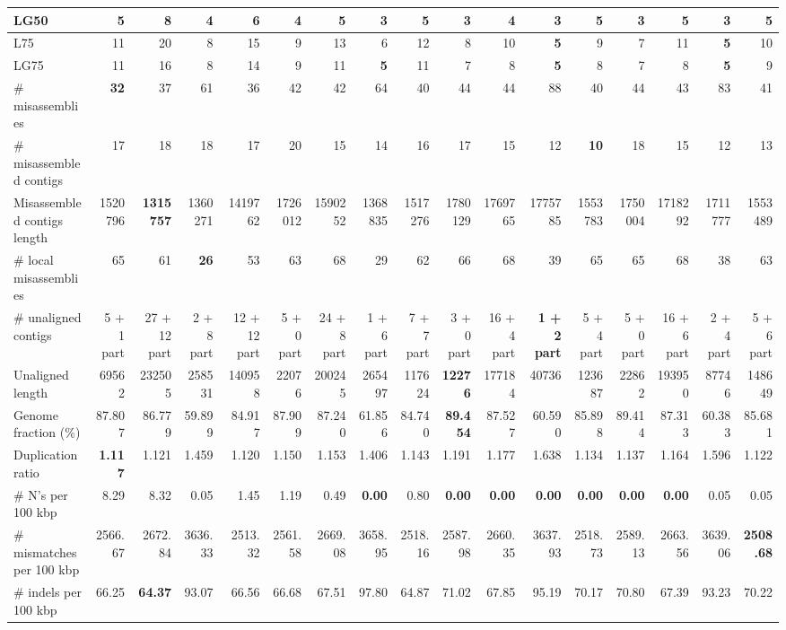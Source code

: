 \documentclass[12pt,a4paper]{article}
\begin{document}
\begin{table}[ht]
\begin{center}
\begin{tabular}{|l*{16}{|r}|}
LG50 & 5 & 8 & 4 & 6 & 4 & 5 & {\bf 3} & 5 & {\bf 3} & 4 & {\bf 3} & 5 & {\bf 3} & 5 & {\bf 3} & 5 \\ \hline
L75 & 11 & 20 & 8 & 15 & 9 & 13 & 6 & 12 & 8 & 10 & {\bf 5} & 9 & 7 & 11 & {\bf 5} & 10 \\ \hline
LG75 & 11 & 16 & 8 & 14 & 9 & 11 & {\bf 5} & 11 & 7 & 8 & {\bf 5} & 8 & 7 & 8 & {\bf 5} & 9 \\ \hline
\# misassemblies & {\bf 32} & 37 & 61 & 36 & 42 & 42 & 64 & 40 & 44 & 44 & 88 & 40 & 44 & 43 & 83 & 41 \\ \hline
\# misassembled contigs & 17 & 18 & 18 & 17 & 20 & 15 & 14 & 16 & 17 & 15 & 12 & {\bf 10} & 18 & 15 & 12 & 13 \\ \hline
Misassembled contigs length & 1520796 & {\bf 1315757} & 1360271 & 1419762 & 1726012 & 1590252 & 1368835 & 1517276 & 1780129 & 1769765 & 1775785 & 1553783 & 1750004 & 1718292 & 1711777 & 1553489 \\ \hline
\# local misassemblies & 65 & 61 & {\bf 26} & 53 & 63 & 68 & 29 & 62 & 66 & 68 & 39 & 65 & 65 & 68 & 38 & 63 \\ \hline
\# unaligned contigs & 5 + 1 part & 27 + 12 part & 2 + 8 part & 12 + 12 part & 5 + 0 part & 24 + 8 part & 1 + 6 part & 7 + 7 part & 3 + 0 part & 16 + 4 part & {\bf 1 + 2 part} & 5 + 4 part & 5 + 0 part & 16 + 6 part & 2 + 4 part & 5 + 6 part \\ \hline
Unaligned length & 69562 & 232505 & 258531 & 140958 & 22076 & 200245 & 265497 & 117624 & {\bf 12276} & 177184 & 40736 & 123687 & 22862 & 193950 & 87746 & 148649 \\ \hline
Genome fraction (\%) & 87.807 & 86.779 & 59.899 & 84.917 & 87.909 & 87.240 & 61.856 & 84.740 & {\bf 89.454} & 87.527 & 60.590 & 85.898 & 89.414 & 87.313 & 60.383 & 85.681 \\ \hline
Duplication ratio & {\bf 1.117} & 1.121 & 1.459 & 1.120 & 1.150 & 1.153 & 1.406 & 1.143 & 1.191 & 1.177 & 1.638 & 1.134 & 1.137 & 1.164 & 1.596 & 1.122 \\ \hline
\# N's per 100 kbp & 8.29 & 8.32 & 0.05 & 1.45 & 1.19 & 0.49 & {\bf 0.00} & 0.80 & {\bf 0.00} & {\bf 0.00} & {\bf 0.00} & {\bf 0.00} & {\bf 0.00} & {\bf 0.00} & 0.05 & 0.05 \\ \hline
\# mismatches per 100 kbp & 2566.67 & 2672.84 & 3636.33 & 2513.32 & 2561.58 & 2669.08 & 3658.95 & 2518.16 & 2587.98 & 2660.35 & 3637.93 & 2518.73 & 2589.13 & 2663.56 & 3639.06 & {\bf 2508.68} \\ \hline
\# indels per 100 kbp & 66.25 & {\bf 64.37} & 93.07 & 66.56 & 66.68 & 67.51 & 97.80 & 64.87 & 71.02 & 67.85 & 95.19 & 70.17 & 70.80 & 67.39 & 93.23 & 70.22 \\ \hline

\end{tabular}
\end{center}
\end{table}
\end{document}

